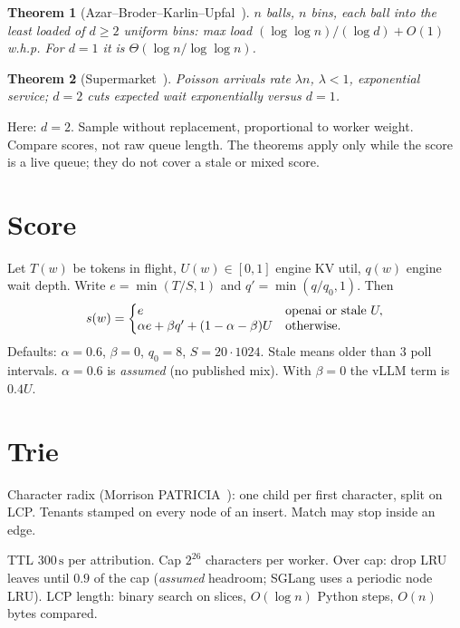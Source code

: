 \documentclass[journal,onecolumn]{IEEEtran}
\newtheorem{theorem}{Theorem}
\begin{document}
\begin{theorem}[Azar--Broder--Karlin--Upfal~\cite{azar1999}]
$n$ balls, $n$ bins, each ball into the least loaded of $d\ge 2$ uniform
bins: max load $(\log\log n)/(\log d)+O(1)$ w.h.p. For $d=1$ it is
$\Theta(\log n/\log\log n)$.
\end{theorem}

\begin{theorem}[Supermarket~\cite{mitzenmacher2001}]
Poisson arrivals rate $\lambda n$, $\lambda<1$, exponential service;
$d=2$ cuts expected wait exponentially versus $d=1$.
\end{theorem}

Here: $d=2$. Sample without replacement, proportional to worker weight.
Compare scores, not raw queue length. The theorems apply only while the
score is a live queue; they do not cover a stale or mixed score.

\section{Score}

Let $T(w)$ be tokens in flight, $U(w)\in[0,1]$ engine KV util, $q(w)$
engine wait depth. Write $e=\min(T/S,1)$ and
$q'=\min(q/q_0,1)$. Then
\begin{equation}
s(w)=\left\{
\begin{array}{@{}ll@{}}
e & \text{openai or stale }U,\\
\alpha e+\beta q'+(1-\alpha-\beta)U & \text{otherwise.}
\end{array}
\right.
\end{equation}
Defaults: $\alpha=0.6$, $\beta=0$, $q_0=8$, $S=20\cdot 1024$. Stale means
older than $3$ poll intervals. $\alpha=0.6$ is \emph{assumed} (no
published mix). With $\beta=0$ the vLLM term is $0.4U$.

\section{Trie}

Character radix (Morrison PATRICIA~\cite{morrison1968}): one child per
first character, split on LCP. Tenants stamped on every node of an insert.
Match may stop inside an edge.

TTL $300\,\mathrm{s}$ per attribution. Cap $2^{26}$ characters per worker.
Over cap: drop LRU leaves until $0.9$ of the cap (\emph{assumed} headroom;
SGLang uses a periodic node LRU). LCP length: binary search on slices,
$O(\log n)$ Python steps, $O(n)$ bytes compared.
\end{document}
